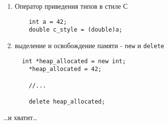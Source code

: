 \begin{enumerate}
\def\labelenumi{\arabic{enumi})}
\setcounter{enumi}{6}
\item
  Оператор приведения типов в стиле С
\begin{verbatim}
    int a = 42;
    double c_style = (double)a;
\end{verbatim}
\item
  выделение и освобождение памяти - \texttt{new} и \texttt{delete}
\begin{verbatim}
  int *heap_allocated = new int;
    *heap_allocated = 42;

    //...

    delete heap_allocated;
\end{verbatim}
\end{enumerate}

\ldots и хватит\ldots{}

